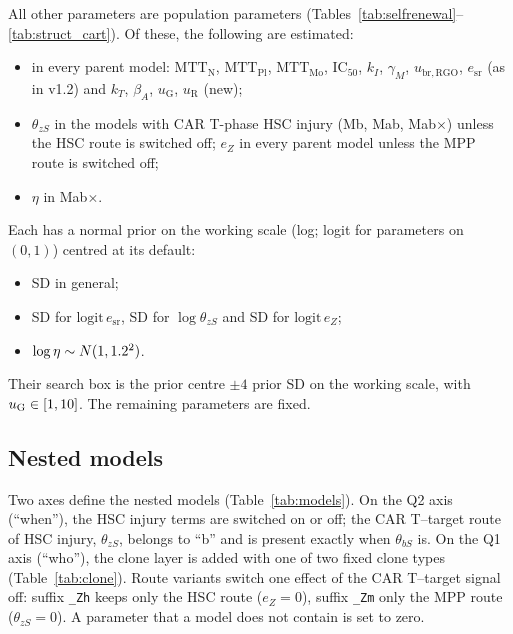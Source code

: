 \documentclass[11pt]{article}
\begin{document}
All other parameters are population parameters (Tables~\ref{tab:selfrenewal}--\ref{tab:struct_cart}). Of these, the following are estimated:
\begin{itemize}
\item in every parent model: $\mathrm{MTT}_{\mathrm{N}}$, $\mathrm{MTT}_{\mathrm{Pl}}$, $\mathrm{MTT}_{\mathrm{Mo}}$, $\mathrm{IC}_{50}$, $k_I$, $\gamma_M$, $u_{\mathrm{br,RGO}}$, $e_{\mathrm{sr}}$ (as in v1.2) and $k_T$, $\beta_A$, $u_{\mathrm{G}}$, $u_{\mathrm{R}}$ (new);
\item $\theta_{zS}$ in the models with CAR T-phase HSC injury (Mb, Mab, Mab$\times$) unless the HSC route is switched off; $e_Z$ in every parent model unless the MPP route is switched off;
\item $\eta$ in Mab$\times$.
\end{itemize}
Each has a normal prior on the working scale (log; logit for parameters on $(0,1)$) centred at its default:
\begin{itemize}
\item SD \valStructSd{} in general;
\item SD \valEsrSd{} for $\mathrm{logit}\,e_{\mathrm{sr}}$, SD \valThzsSd{} for $\log\theta_{zS}$ and SD \valEzSd{} for $\mathrm{logit}\,e_Z$;
\item $\log\eta\sim N(1,1.2^2)$.
\end{itemize}
Their search box is the prior centre $\pm4$ prior SD on the working scale, with $u_{\mathrm{G}}\in[1,10]$. The remaining parameters are fixed.

\subsection{Nested models}\label{sec:nested}
Two axes define the nested models (Table~\ref{tab:models}). On the Q2 axis (``when''), the HSC injury terms are switched on or off; the CAR T--target route of HSC injury, $\theta_{zS}$, belongs to ``b'' and is present exactly when $\theta_{bS}$ is. On the Q1 axis (``who''), the clone layer is added with one of two fixed clone types (Table~\ref{tab:clone}). Route variants switch one effect of the CAR T--target signal off: suffix \texttt{\_Zh} keeps only the HSC route ($e_Z=0$), suffix \texttt{\_Zm} only the MPP route ($\theta_{zS}=0$). A parameter that a model does not contain is set to zero.
\end{document}
